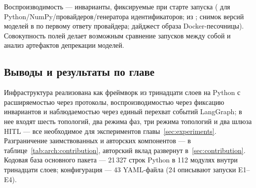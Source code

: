Воспроизводимость --- инварианты, фиксируемые при старте запуска
( для Python/NumPy/провайдеров/генератора
идентификаторов;  из ;
снимок версий моделей в  по первому
ответу провайдера; дайджест образа Docker-песочницы). Совокупность
полей делает возможным сравнение запусков между собой и анализ
артефактов депрекации моделей.

\subsection{Выводы и результаты по главе}
\label{sec:arch:summary}

Инфраструктура реализована как фреймворк из тринадцати слоев на
Python с расширяемостью через протоколы, воспроизводимостью через
фиксацию инвариантов и наблюдаемостью через единый перехват
событий LangGraph; в нее входят шесть топологий, два режима фаз,
три режима топологий и два шлюза HITL --- все необходимое для
экспериментов главы~\ref{sec:experiments}. Разграничение
заимствованных и авторских компонентов --- в
таблице~\ref{tab:arch:contribution}, авторский вклад
развернут в~\ref{sec:contribution}. Кодовая база основного пакета
 --- 21\,327 строк Python в 112 модулях внутри
тринадцати слоев; конфигурация --- 43 YAML-файла (24 описывают
запуски E1--E4).
